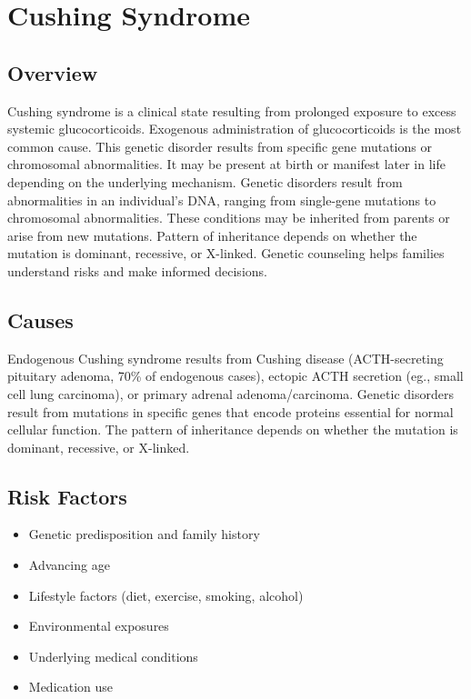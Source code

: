 \chapter{Cushing Syndrome}
\label{sec:Cushing Syndrome}

\section{Overview}
Cushing syndrome is a clinical state resulting from prolonged exposure to excess systemic glucocorticoids. Exogenous administration of glucocorticoids is the most common cause. This genetic disorder results from specific gene mutations or chromosomal abnormalities. It may be present at birth or manifest later in life depending on the underlying mechanism. Genetic disorders result from abnormalities in an individual's DNA, ranging from single-gene mutations to chromosomal abnormalities. These conditions may be inherited from parents or arise from new mutations. Pattern of inheritance depends on whether the mutation is dominant, recessive, or X-linked. Genetic counseling helps families understand risks and make informed decisions.
\section{Causes}
Endogenous Cushing syndrome results from Cushing disease (ACTH-secreting pituitary adenoma, 70\% of endogenous cases), ectopic ACTH secretion (eg., small cell lung carcinoma), or primary adrenal adenoma/carcinoma. Genetic disorders result from mutations in specific genes that encode proteins essential for normal cellular function. The pattern of inheritance depends on whether the mutation is dominant, recessive, or X-linked.   
\section{Risk Factors}

\begin{itemize}[noitemsep]
  \item Genetic predisposition and family history
  \item Advancing age
  \item Lifestyle factors (diet, exercise, smoking, alcohol)
  \item Environmental exposures
  \item Underlying medical conditions
  \item Medication use
\end{itemize}
